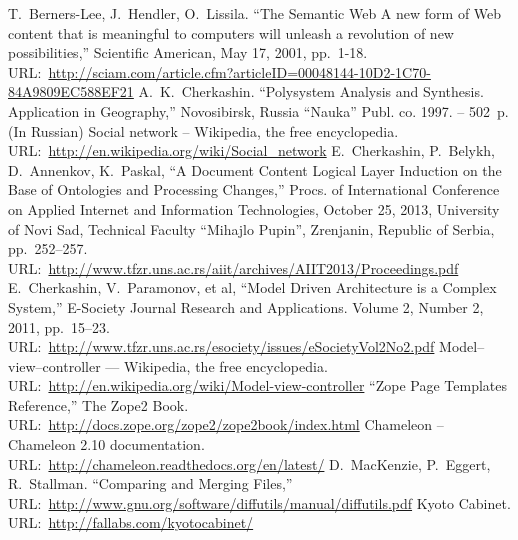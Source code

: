 \documentclass[conference]{IEEEtran}
\begin{document}
%
%
%
\begin{thebibliography}{11}
 T.~Berners-Lee, J.~Hendler, O.~Lissila. ``The
  Semantic Web A new form of Web content that is meaningful to
  computers will unleash a revolution of new possibilities,''
  Scientific American, May 17, 2001,
  pp.~1-18. URL:~\url{http://sciam.com/article.cfm?articleID=00048144-10D2-1C70-84A9809EC588EF21}
 A.~K.~Cherkashin. ``Polysystem Analysis and
  Synthesis. Application in Geography,'' Novosibirsk, Russia ``Nauka'' Publ. co.
  1997. -- 502~p. (In Russian)
 Social network -- Wikipedia, the free encyclopedia.
  URL:~\url{http://en.wikipedia.org/wiki/Social_network}
 E.~Cherkashin, P.~Belykh, D.~Annenkov, K.~Paskal, ``A
  Document Content Logical Layer Induction on the Base of Ontologies
  and Processing Changes,'' Procs. of International Conference on
  Applied Internet and Information Technologies, October 25, 2013,
  University of Novi Sad, Technical Faculty ``Mihajlo Pupin'',
  Zrenjanin, Republic of Serbia,
  pp.~252--257. URL:~\url{http://www.tfzr.uns.ac.rs/aiit/archives/AIIT2013/Proceedings.pdf}
 E.~Cherkashin, V.~Paramonov, et al, ``Model Driven
  Architecture is a Complex System,'' E-Society Journal Research and
  Applications. Volume 2, Number 2, 2011, pp.~15--23.
  URL:~\url{http://www.tfzr.uns.ac.rs/esociety/issues/eSocietyVol2No2.pdf}
 Model--view--controller --- Wikipedia, the free
  encyclopedia.
  URL:~\url{http://en.wikipedia.org/wiki/Model-view-controller}
 ``Zope Page Templates Reference,'' The Zope2 Book. URL:~\url{http://docs.zope.org/zope2/zope2book/index.html}
 Chameleon -- Chameleon 2.10 documentation.
  URL:~\url{http://chameleon.readthedocs.org/en/latest/}
 D.~MacKenzie, P.~Eggert, R.~Stallman. ``Comparing and
  Merging Files,''
  URL:~\url{http://www.gnu.org/software/diffutils/manual/diffutils.pdf}
 Kyoto Cabinet. URL:~\url{http://fallabs.com/kyotocabinet/}
\end{thebibliography}
\end{document}
